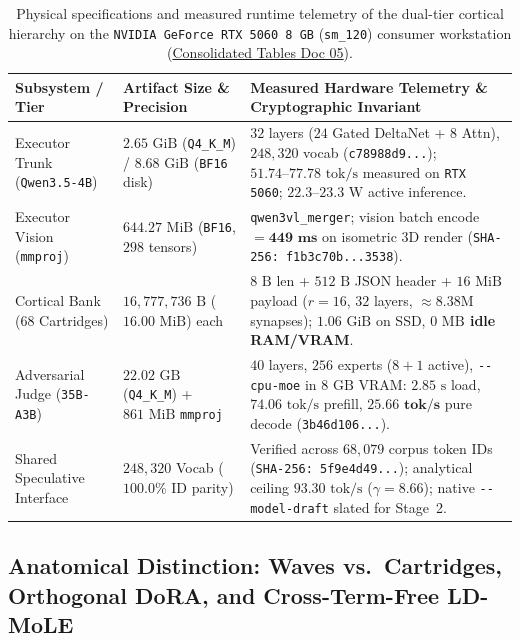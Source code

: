 \documentclass[10pt,a4paper]{article}
\begin{document}
\begin{table}[!htbp]
\centering
\caption{Physical specifications and measured runtime telemetry of the dual-tier cortical hierarchy on the \texttt{NVIDIA GeForce RTX 5060 8 GB} (\texttt{sm\_\allowbreak{}120}) consumer workstation (\href{https://docs.google.com/document/d/1SMqD_TRf6Qi8UwPTFYjKPNvdVlEtpCqr3Ex57x76FsI/edit?usp=drivesdk}{Consolidated Tables Doc 05}).}
\label{tab:dualtier}
\footnotesize
\begin{tabularx}{\linewidth}{@{}llY@{}}
\toprule
\textbf{Subsystem / Tier} & \textbf{Artifact Size \& Precision} & \textbf{Measured Hardware Telemetry \& Cryptographic Invariant} \\
\midrule
Executor Trunk (\texttt{Qwen3.5-4B}) & $2.65\text{ GiB}$ (\texttt{Q4\_\allowbreak{}K\_\allowbreak{}M}) / $8.68\text{ GiB}$ (\texttt{BF16} disk) & $32$ layers ($24$ Gated DeltaNet + $8$ Attn), $248,320$ vocab (\texttt{c78988d9...}); $51.74\text{--}77.78\text{ tok/s}$ measured on \texttt{RTX 5060}; $22.3\text{--}23.3\text{ W}$ active inference. \\
Executor Vision (\texttt{mmproj}) & $644.27\text{ MiB}$ (\texttt{BF16}, $298$ tensors) & \texttt{qwen3vl\_\allowbreak{}merger}; vision batch encode $= \mathbf{449\text{ ms}}$ on isometric 3D render (\texttt{SHA-256: f1b3c70b...3538}). \\
Cortical Bank ($68$ Cartridges) & $16,777,736\text{ B}$ ($16.00\text{ MiB}$) each & $8\text{ B}$ len + $512\text{ B}$ JSON header + $16\text{ MiB}$ payload ($r=16$, $32$ layers, $\approx 8.38\text{M}$ synapses); $1.06\text{ GiB}$ on SSD, \textbf{$0\text{ MB}$ idle RAM/VRAM}. \\
Adversarial Judge (\texttt{35B-A3B}) & $22.02\text{ GB}$ (\texttt{Q4\_\allowbreak{}K\_\allowbreak{}M}) + $861\text{ MiB}$ \texttt{mmproj} & $40$ layers, $256$ experts ($8+1$ active), \texttt{-{}-cpu-moe} in $8\text{ GB}$ VRAM: $2.85\text{ s}$ load, $74.06\text{ tok/s}$ prefill, $\mathbf{25.66\text{ tok/s}}$ pure decode (\texttt{3b46d106...}). \\
Shared Speculative Interface & $248,320$ Vocab ($100.0\%$ ID parity) & Verified across $68,079$ corpus token IDs (\texttt{SHA-256: 5f9e4d49...}); analytical ceiling $93.30\text{ tok/s}$ ($\gamma=8.66$); native \texttt{-{}-model-draft} slated for Stage~2. \\
\bottomrule
\end{tabularx}
\end{table}

\subsection{Anatomical Distinction: Waves vs.\ Cartridges, Orthogonal DoRA, and Cross-Term-Free LD-MoLE}
\end{document}
